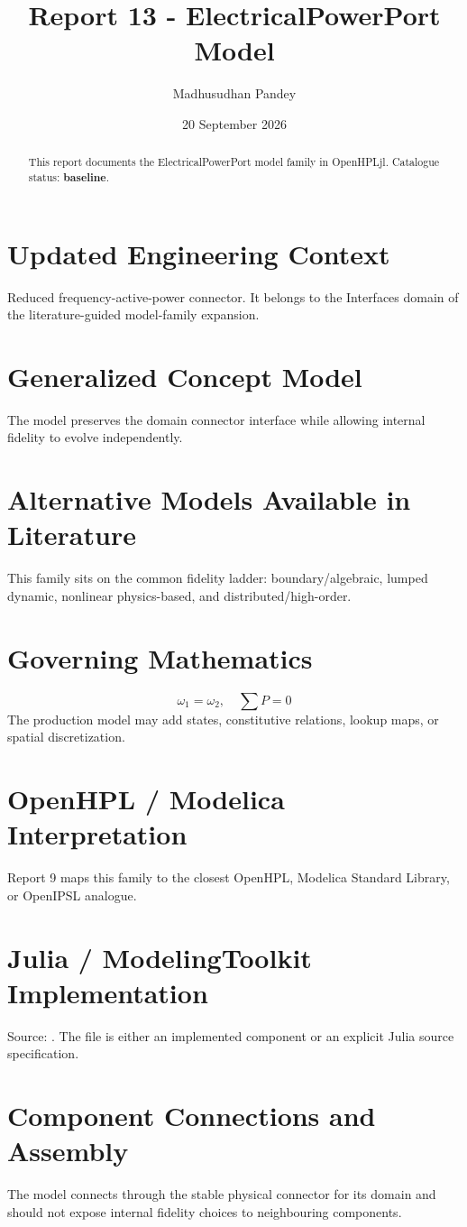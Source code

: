 \documentclass[10pt,a4paper]{article}
\title{Report 13 - ElectricalPowerPort Model}
\author{Madhusudhan Pandey}
\date{20 September 2026}
\begin{document}
\maketitle
\begin{abstract}
This report documents the ElectricalPowerPort model family in OpenHPLjl. Catalogue status: \textbf{baseline}.
\end{abstract}
\section{Updated Engineering Context}
Reduced frequency-active-power connector. It belongs to the Interfaces domain of the literature-guided model-family expansion.
\section{Generalized Concept Model}
The model preserves the domain connector interface while allowing internal fidelity to evolve independently.
\section{Alternative Models Available in Literature}
This family sits on the common fidelity ladder: boundary/algebraic, lumped dynamic, nonlinear physics-based, and distributed/high-order.
\section{Governing Mathematics}
\[\omega_1=\omega_2,\quad \sum P=0\]
The production model may add states, constitutive relations, lookup maps, or spatial discretization.
\section{OpenHPL / Modelica Interpretation}
Report 9 maps this family to the closest OpenHPL, Modelica Standard Library, or OpenIPSL analogue.
\section{Julia / ModelingToolkit Implementation}
Source: \texttt{}. The file is either an implemented component or an explicit Julia source specification.
\section{Component Connections and Assembly}
The model connects through the stable physical connector for its domain and should not expose internal fidelity choices to neighbouring components.
\end{document}
